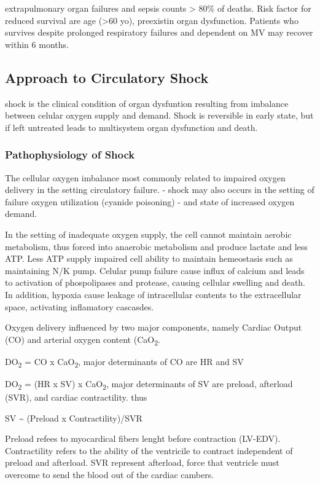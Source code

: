 \documentclass[
  letterpaper,
  DIV=11,
  numbers=noendperiod]{scrreprt}
\begin{document}
extrapulmonary organ failures and sepsis counts \textgreater{} 80\% of
deaths. Risk factor for reduced survival are age (\textgreater60 yo),
preexistin organ dysfunction. Patients who survives despite prolonged
respiratory failures and dependent on MV may recover within 6 months.

\subsection{Approach to Circulatory
Shock}\label{approach-to-circulatory-shock}

shock is the clinical condition of organ dysfuntion resulting from
imbalance between celular oxygen supply and demand. Shock is reversible
in early state, but if left untreated leads to multisystem organ
dysfunction and death.

\subsubsection{Pathophysiology of Shock}\label{pathophysiology-of-shock}

The cellular oxygen imbalance most commonly related to impaired oxygen
delivery in the setting circulatory failure. - shock may also occurs in
the setting of failure oxygen utilization (cyanide poisoning) - and
state of increased oxygen demand.

In the setting of inadequate oxygen supply, the cell cannot maintain
aerobic metabolism, thus forced into anaerobic metabolism and produce
lactate and less ATP. Less ATP supply impaired cell ability to maintain
hemeostasis such as maintaining N/K pump. Celular pump failure cause
influx of calcium and leads to activation of phospolipases and protease,
causing cellular swelling and death. In addition, hypoxia cause leakage
of intracellular contents to the extracellular space, activating
inflamatory cascasdes.

Oxygen delivery influenced by two major components, namely Cardiac
Output (CO) and arterial oxygen content (CaO\textsubscript{2}.

DO\textsubscript{2} = CO x CaO\textsubscript{2}, major determinants of
CO are HR and SV

DO\textsubscript{2} = (HR x SV) x CaO\textsubscript{2}, major
determinants of SV are preload, afterload (SVR), and cardiac
contractility. thus

SV \textasciitilde{} (Preload x Contractility)/SVR

Preload refees to myocardical fibers lenght before contraction (LV-EDV).
Contractility refers to the ability of the ventricile to contract
independent of preload and afterload. SVR represent afterload, force
that ventricle must overcome to send the blood out of the cardiac
cambers.
\end{document}
